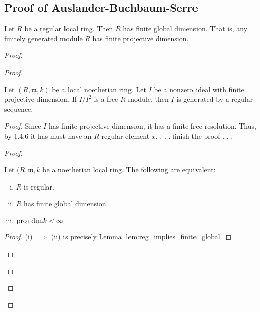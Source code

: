 \subsection{Proof of Auslander-Buchbaum-Serre}



\begin{lemma}
  \label{lem:reg_implies_finite_global}
  Let $R$ be a regular local ring.
  Then $R$ has finite global dimension.
  That is, any finitely generated module $R$ has finite
  projective dimension.
\end{lemma}

\begin{proof}
\begin{proof}

\begin{theorem}
  \label{thm:ferrand_vasconcelos}

  Let $(R,\mathfrak{m},k)$ be a local noetherian ring.
  Let $I$ be a nonzero ideal with finite projective dimension.
  If $I / I^2$ is a free $R$-module, 
  then $I$ is generated by a regular sequence.
\end{theorem}

\begin{proof}
  Since $I$ has finite projective dimension, it has a finite free
  resolution.
  Thus, by 1.4.6 it has must have an $R$-regular element $x$.
  . . . finish the proof . . . 
\begin{proof}


\begin{theorem}
  \label{thm:auslander_buchsbaum_serre}
  Let $(R,\mathfrak{m},k$ be a noetherian local ring.
  The following are equivalent:
  \begin{enumerate}[(i)]
    \item $R$ is regular.
    \item $R$ has finite global dimension.
    \item $\text{proj dim} k < \infty$
  \end{enumerate}
\end{theorem}

\begin{proof}

  (i) $\implies$ (ii) is precisely Lemma \ref{lem:reg_implies_finite_global}


\end{proof}
\end{proof}
\end{proof}
\end{proof}
\end{proof}
